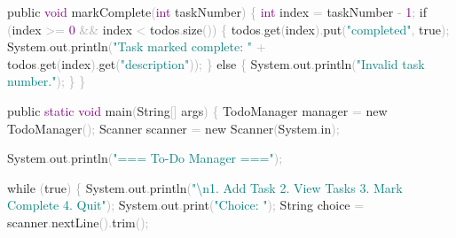 \documentclass[
  justified,
  openright,
]{tufte-book}
\newcommand{\BuiltInTok}[1]{#1}
\newcommand{\ControlFlowTok}[1]{\textcolor{BrandBlue}{#1}}
\newcommand{\DataTypeTok}[1]{\textcolor{Purple}{#1}}
\newcommand{\DecValTok}[1]{\textcolor{Purple}{#1}}
\newcommand{\FunctionTok}[1]{\textcolor{BrandBlue}{#1}}
\newcommand{\KeywordTok}[1]{\textcolor{BrandBlue}{#1}}
\newcommand{\NormalTok}[1]{#1}
\newcommand{\OperatorTok}[1]{\textcolor{DarkGray}{#1}}
\newcommand{\SpecialCharTok}[1]{\textcolor{Teal}{#1}}
\newcommand{\StringTok}[1]{\textcolor{Teal}{#1}}
\newenvironment{Shaded}{%
  \begin{snugshade}
}{%
  \end{snugshade}
}
\begin{document}
\begin{Shaded}
\begin{Highlighting}[]
    \KeywordTok{public} \DataTypeTok{void} \FunctionTok{markComplete}\OperatorTok{(}\DataTypeTok{int}\NormalTok{ taskNumber}\OperatorTok{)} \OperatorTok{\{}
        \DataTypeTok{int}\NormalTok{ index }\OperatorTok{=}\NormalTok{ taskNumber }\OperatorTok{{-}} \DecValTok{1}\OperatorTok{;}
        \ControlFlowTok{if} \OperatorTok{(}\NormalTok{index }\OperatorTok{\textgreater{}=} \DecValTok{0} \OperatorTok{\&\&}\NormalTok{ index }\OperatorTok{\textless{}}\NormalTok{ todos}\OperatorTok{.}\FunctionTok{size}\OperatorTok{())} \OperatorTok{\{}
\NormalTok{            todos}\OperatorTok{.}\FunctionTok{get}\OperatorTok{(}\NormalTok{index}\OperatorTok{).}\FunctionTok{put}\OperatorTok{(}\StringTok{"completed"}\OperatorTok{,} \KeywordTok{true}\OperatorTok{);}
            \BuiltInTok{System}\OperatorTok{.}\FunctionTok{out}\OperatorTok{.}\FunctionTok{println}\OperatorTok{(}\StringTok{"Task marked complete: "} \OperatorTok{+}\NormalTok{ todos}\OperatorTok{.}\FunctionTok{get}\OperatorTok{(}\NormalTok{index}\OperatorTok{).}\FunctionTok{get}\OperatorTok{(}\StringTok{"description"}\OperatorTok{));}
        \OperatorTok{\}} \ControlFlowTok{else} \OperatorTok{\{}
            \BuiltInTok{System}\OperatorTok{.}\FunctionTok{out}\OperatorTok{.}\FunctionTok{println}\OperatorTok{(}\StringTok{"Invalid task number."}\OperatorTok{);}
        \OperatorTok{\}}
    \OperatorTok{\}}

    \KeywordTok{public} \DataTypeTok{static} \DataTypeTok{void} \FunctionTok{main}\OperatorTok{(}\BuiltInTok{String}\OperatorTok{[]}\NormalTok{ args}\OperatorTok{)} \OperatorTok{\{}
\NormalTok{        TodoManager manager }\OperatorTok{=} \KeywordTok{new} \FunctionTok{TodoManager}\OperatorTok{();}
        \BuiltInTok{Scanner}\NormalTok{ scanner }\OperatorTok{=} \KeywordTok{new} \BuiltInTok{Scanner}\OperatorTok{(}\BuiltInTok{System}\OperatorTok{.}\FunctionTok{in}\OperatorTok{);}

        \BuiltInTok{System}\OperatorTok{.}\FunctionTok{out}\OperatorTok{.}\FunctionTok{println}\OperatorTok{(}\StringTok{"=== To{-}Do Manager ==="}\OperatorTok{);}

        \ControlFlowTok{while} \OperatorTok{(}\KeywordTok{true}\OperatorTok{)} \OperatorTok{\{}
            \BuiltInTok{System}\OperatorTok{.}\FunctionTok{out}\OperatorTok{.}\FunctionTok{println}\OperatorTok{(}\StringTok{"}\SpecialCharTok{\textbackslash{}n}\StringTok{1. Add Task  2. View Tasks  3. Mark Complete  4. Quit"}\OperatorTok{);}
            \BuiltInTok{System}\OperatorTok{.}\FunctionTok{out}\OperatorTok{.}\FunctionTok{print}\OperatorTok{(}\StringTok{"Choice: "}\OperatorTok{);}
            \BuiltInTok{String}\NormalTok{ choice }\OperatorTok{=}\NormalTok{ scanner}\OperatorTok{.}\FunctionTok{nextLine}\OperatorTok{().}\FunctionTok{trim}\OperatorTok{();}


\end{Highlighting}
\end{Shaded}
\end{document}

